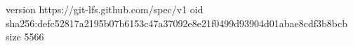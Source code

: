 version https://git-lfs.github.com/spec/v1
oid sha256:defc52817a2195b07b6153c47a37092e8e21f0499d93904d01abae8cdf3b8bcb
size 5566
